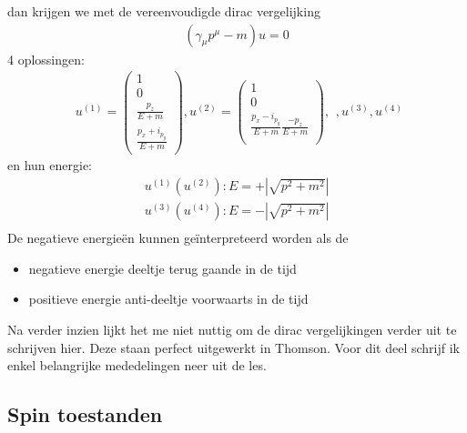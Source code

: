 \documentclass[../main.tex]{subfiles}
\begin{document}
dan krijgen we met de vereenvoudigde dirac vergelijking
\begin{equation}
    \begin{aligned}
        \label{eq:dirac_vrij}
        (\gamma_\mu p^\mu-m)u=0
    \end{aligned}
\end{equation}
4 oplossingen:
\begin{equation}
    \begin{aligned}
        \label{eq:dirac_vrij_opl}
        u^{(1)}=
        \begin{pmatrix}
            1\\
            0\\
            \frac{p_z}{E+m}\\
            \frac{p_x+i_{p_y}}{E+m} 
        \end{pmatrix},
        u^{(2)}=
        \begin{pmatrix}
            1\\
            0\\
            \frac{p_x-i_{p_y}}{E+m} 
            \frac{-p_z}{E+m}\\
        \end{pmatrix},
    \end{aligned},
        u^{(3)},u^{(4)}
\end{equation}
en hun energie:
\begin{equation}
    \begin{aligned}
        \label{eq:dirac_vrij_energie}
        u^{(1)}(u^{(2)}):E=+|\sqrt{p^2+m^2}|\\
        u^{(3)}(u^{(4)}):E=-|\sqrt{p^2+m^2}|\\
    \end{aligned}
\end{equation}
De negatieve energieën kunnen geïnterpreteerd worden als de
\begin{itemize}
    \item negatieve energie deeltje terug gaande in de tijd
    \item positieve energie anti-deeltje voorwaarts in de tijd
\end{itemize}
{\color{green} Na verder inzien lijkt het me niet nuttig om de dirac vergelijkingen verder uit te schrijven hier. Deze staan perfect uitgewerkt in Thomson. Voor dit deel schrijf ik enkel belangrijke mededelingen neer uit de les.}

\subsection{Spin toestanden}%
\label{sub:spin_toestanden}
\end{document}
